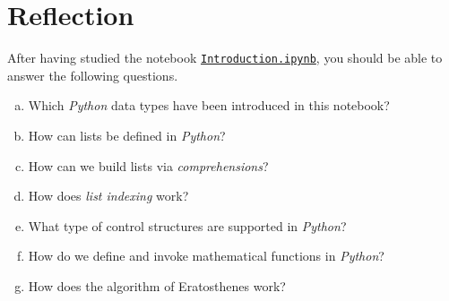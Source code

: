 \section{Reflection}
After having studied the notebook
\href{https://github.com/karlstroetmann/Algorithms}{\texttt{Introduction.ipynb}}, you should be able to answer the following questions.
\begin{enumerate}[(a)]
\item Which \textsl{Python} data types have been introduced in this notebook?
\item How can lists be defined in \textsl{Python}?
\item How can we build lists via \emph{comprehensions}? 
\item How does \emph{list indexing} work?
\item What type of control structures are supported in \textsl{Python}?
\item How do we define and invoke mathematical functions in \textsl{Python}?
\item How does the algorithm of Eratosthenes work?  
\end{enumerate}



